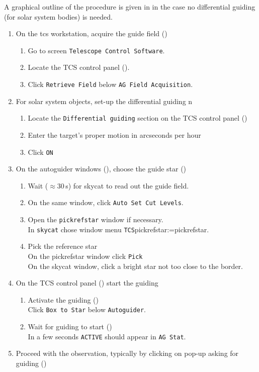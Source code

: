 \documentclass[11pt,fleqn,a4paper]{book}
\makeatletter
\def\menu#1#2{\texttt{#1}\ifx{}#2\else\@for\@x:=#2\do{$\rightarrow$\texttt{\@x}}\fi}
\def\wmenu#1#2{window menu \menu{#1}{#2}}
\makeatother
\begin{document}
\label{proc:guidewfi}
A graphical outline of the procedure is given in  in the case no differential guiding (for solar system bodies) is needed.
\begin{enumerate}
    \item On the \gls{tcs} workstation, acquire the guide field ()
    \begin{enumerate}
        \item Go to screen \texttt{Telescope Control Software}.
        \item Locate the \gls{TCS control panel} ().
        \item Click \texttt{Retrieve Field} below \texttt{AG Field Acquisition}.
    \end{enumerate}
    \item For solar system objects, set-up the differential guiding
n  
    \begin{enumerate}
        \item Locate the \texttt{Differential guiding} section on the \gls{TCS control panel} ()
        \item Enter the target's proper motion in arcseconds per hour
        \item Click \texttt{ON}
    \end{enumerate}
    \item On the autoguider windows (), choose the guide star ()
    \begin{enumerate}
        \item Wait ($\approx 30$\,s) for \gls{skycat} to read out the guide field.
        \item On the same window, click \texttt{Auto Set Cut Levels}.
        \item Open the \texttt{\gls{pickrefstar}} window if necessary.\\
          In \texttt{skycat} chose \wmenu{TCS}{\gls{pickrefstar}}.
        \item Pick the reference star\\
          On the \gls{pickrefstar} window click \texttt{Pick}\\
          On the \gls{skycat} window, click a bright star not too close to the border. 
    \end{enumerate}
    \item On the \gls{TCS control panel} () start the guiding
    \begin{enumerate}
        \item Activate the guiding ()\\
              Click \texttt{Box to Star} below \texttt{Autoguider}.
        \item Wait for guiding to start ()\\
              In a few seconds \texttt{\-\-\-ACTIVE\-\-\-} should appear in \texttt{AG Stat}.
    \end{enumerate}
    \item Proceed with the observation, typically by clicking on pop-up asking for guiding ()
\end{enumerate}
\end{document}
